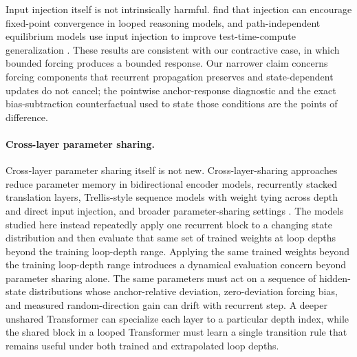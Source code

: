 \documentclass[letterpaper]{article} %
\theoremstyle{remark}
\begin{document}
Input injection itself is not intrinsically harmful.  \citet{blayney2026mechanistic} find that injection can encourage fixed-point convergence in looped reasoning models, and path-independent equilibrium models use input injection to improve test-time-compute generalization \citep{anil2022path}.  These results are consistent with our contractive case, in which bounded forcing produces a bounded response.  Our narrower claim concerns forcing components that recurrent propagation preserves and state-dependent updates do not cancel; the pointwise anchor-response diagnostic and the exact bias-subtraction counterfactual used to state those conditions are the points of difference.

\paragraph{Cross-layer parameter sharing.} Cross-layer parameter sharing itself is not new.  Cross-layer-sharing approaches reduce parameter memory in bidirectional encoder models, recurrently stacked translation layers, Trellis-style sequence models with weight tying across depth and direct input injection, and broader parameter-sharing settings \citep{lan2020albert,dabre2019recurrent,bai2019trellis,takase2023lessons}.  The models studied here instead repeatedly apply one recurrent block to a changing state distribution and then evaluate that same set of trained weights at loop depths beyond the training loop-depth range.  Applying the same trained weights beyond the training loop-depth range introduces a dynamical evaluation concern beyond parameter sharing alone.  The same parameters must act on a sequence of hidden-state distributions whose anchor-relative deviation, zero-deviation forcing bias, and measured random-direction gain can drift with recurrent step.  A deeper unshared Transformer can specialize each layer to a particular depth index, while the shared block in a looped Transformer must learn a single transition rule that remains useful under both trained and extrapolated loop depths.
\end{document}
